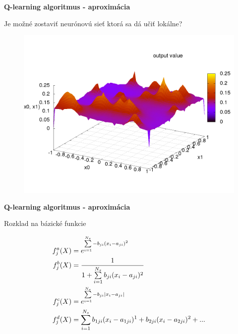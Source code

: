 \documentclass[xcolor=dvipsnames]{beamer}
\begin{document}
\begin{frame}{\bf Q-learning algoritmus - aproximácia}

Je možné zostaviť neurónovú sieť ktorá sa dá učiť lokálne?

\begin{figure}[!htb]
\includegraphics[scale=.35]{../pictures/gaussian.png}
\end{figure}

\end{frame}


\begin{frame}{\bf Q-learning algoritmus - aproximácia}

Rozklad na bázické funkcie

\begin{align}
    f_j^a(\boldmath{X}) &= e^{ \sum\limits_{i=1}^{N_s}{-b_{ji}(x_i - a_{ji})^2} } \\
    f_j^b(\boldmath{X}) &= \frac{1}{1 + \sum\limits_{i=1}^{N_s}{b_{ji}(x_i - a_{ji})^2}} \nonumber \\
    f_j^c(\boldmath{X}) &= e^{ \sum\limits_{i=1}^{N_s}{-b_{ji}\mid x_i - a_{ji} \mid} } \nonumber  \\
    f_j^d(\boldmath{X}) &= \sum\limits_{i=1}^{N_s}{ b_{1ji}(x_i - a_{1ji})^1 + b_{2ji}(x_i - a_{2ji})^2 + ...  } \nonumber
\end{align}

\end{frame}
\end{document}
